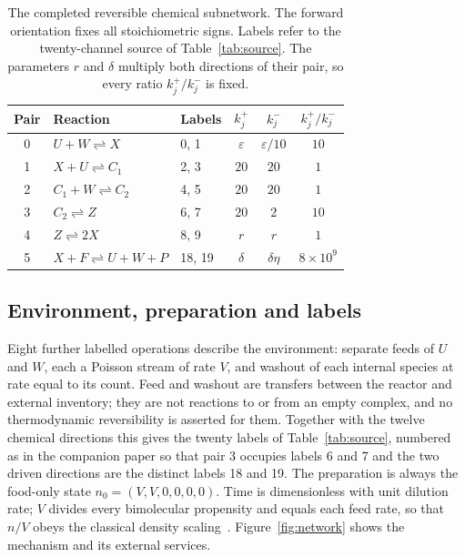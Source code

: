 \documentclass[11pt,a4paper]{article}
\theoremstyle{plain}
\theoremstyle{definition}
\theoremstyle{remark}
\newcommand{\eps}{\varepsilon}
\begin{document}
\begin{table}[t]
\centering
\caption{The completed reversible chemical subnetwork. The forward orientation fixes all stoichiometric signs. Labels refer to the twenty-channel source of Table~\ref{tab:source}. The parameters $r$ and $\delta$ multiply both directions of their pair, so every ratio $k_j^+/k_j^-$ is fixed.}\label{tab:chem}
\begin{tabular}{cllccc}
\toprule Pair & Reaction & Labels & $k_j^+$ & $k_j^-$ & $k_j^+/k_j^-$\\\midrule
0 & $U+W\rightleftharpoons X$ & 0, 1 & $\eps$ & $\eps/10$ & $10$\\
1 & $X+U\rightleftharpoons C_1$ & 2, 3 & $20$ & $20$ & $1$\\
2 & $C_1+W\rightleftharpoons C_2$ & 4, 5 & $20$ & $20$ & $1$\\
3 & $C_2\rightleftharpoons Z$ & 6, 7 & $20$ & $2$ & $10$\\
4 & $Z\rightleftharpoons 2X$ & 8, 9 & $r$ & $r$ & $1$\\
5 & $X+F\rightleftharpoons U+W+P$ & 18, 19 & $\delta$ & $\delta\eta$ & $8\times10^{9}$\\\bottomrule
\end{tabular}
\end{table}

\subsection{Environment, preparation and labels}\label{sec:environment}
Eight further labelled operations describe the environment: separate feeds of $U$ and $W$, each a Poisson stream of rate $V$, and washout of each internal species at rate equal to its count. Feed and washout are transfers between the reactor and external inventory; they are not reactions to or from an empty complex, and no thermodynamic reversibility is asserted for them. Together with the twelve chemical directions this gives the twenty labels of Table~\ref{tab:source}, numbered as in the companion paper so that pair 3 occupies labels 6 and 7 and the two driven directions are the distinct labels 18 and 19. The preparation is always the food-only state $n_0=(V,V,0,0,0,0)$. Time is dimensionless with unit dilution rate; $V$ divides every bimolecular propensity and equals each feed rate, so that $n/V$ obeys the classical density scaling~\citep{kurtz1972,anderson2015}. Figure~\ref{fig:network} shows the mechanism and its external services.
\end{document}
